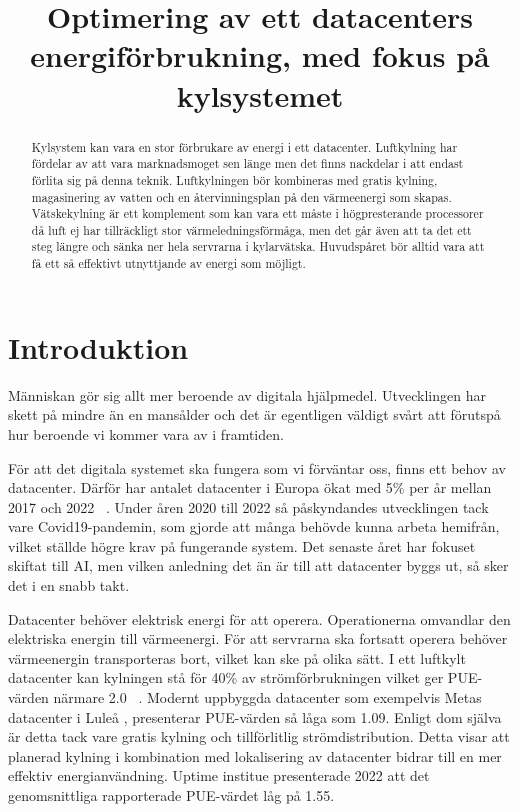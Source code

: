 \documentclass[conference,a4paper]{IEEEtran}
\begin{document}
\title{Optimering av ett datacenters energiförbrukning, med fokus på kylsystemet}
\author{
}
\maketitle
\begin{abstract}
Kylsystem kan vara en stor förbrukare av energi i ett datacenter. Luftkylning har fördelar av att vara marknadsmoget sen länge men det finns nackdelar 
i att endast förlita sig på denna teknik. Luftkylningen bör kombineras med gratis kylning, magasinering av vatten och en återvinningsplan på den värmeenergi 
som skapas. Vätskekylning är ett komplement som kan vara ett måste i högpresterande processorer då luft ej har tillräckligt stor värmeledningsförmåga, men 
det går även att ta det ett steg längre och sänka ner hela servrarna i kylarvätska. Huvudspåret bör alltid vara att få ett så effektivt utnyttjande 
av energi som möjligt.  
\end{abstract}
\section{Introduktion}
Människan gör sig allt mer beroende av digitala hjälpmedel. Utvecklingen har skett på mindre än en mansålder 
och det är egentligen väldigt svårt att förutspå hur beroende vi kommer vara av i framtiden.

För att det digitala systemet ska fungera som vi förväntar oss, finns ett behov av datacenter. Därför har antalet datacenter i Europa ökat med 5\% per år
mellan 2017 och 2022 ~\cite{marketoverview1}. Under åren 2020 till 2022 så påskyndandes utvecklingen tack vare Covid19-pandemin, som gjorde att många 
behövde kunna arbeta hemifrån, vilket ställde högre krav på fungerande system. Det senaste året har fokuset skiftat till AI, men vilken anledning det än 
är till att datacenter byggs ut, så sker det i en snabb takt. 

Datacenter behöver elektrisk energi för att operera. Operationerna omvandlar den elektriska energin till värmeenergi. För att servrarna ska fortsatt operera behöver 
värmeenergin transporteras bort, vilket kan ske på olika sätt. I ett luftkylt datacenter kan kylningen stå för 40\% av strömförbrukningen vilket ger PUE-värden närmare 2.0
~\cite{modelling2,energy3}. Modernt uppbyggda datacenter som exempelvis Metas datacenter i Luleå \cite{META}, presenterar PUE-värden så låga som 
1.09. Enligt dom själva är detta tack vare gratis kylning och tillförlitlig strömdistribution. Detta visar att planerad kylning i kombination med 
lokalisering av datacenter bidrar till en mer effektiv energianvändning. Uptime institue presenterade 2022 att det genomsnittliga rapporterade PUE-värdet låg på
1.55. \cite{PUE} 
\end{document}

